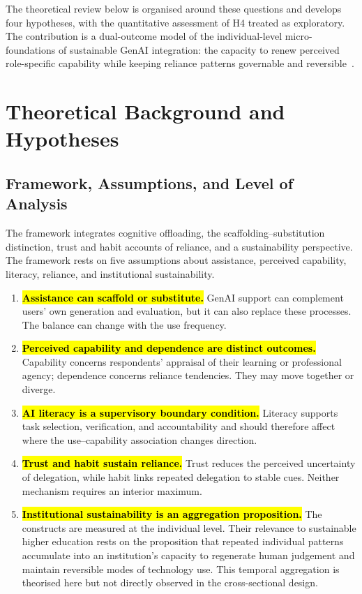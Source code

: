 \documentclass[sustainability,article,accept,moreauthors]{Definitions/mdpi}
\begin{document}
The theoretical review below is organised around these questions and develops four hypotheses, with the quantitative assessment of H4 treated as exploratory. The contribution is a dual-outcome model of the individual-level micro-foundations of sustainable GenAI integration: the capacity to renew perceived role-specific capability while keeping reliance patterns governable and reversible~\cite{chen2026}.

\section{Theoretical Background and Hypotheses}\label{sec:theory}

\subsection{Framework, Assumptions, and Level of Analysis}\label{sec:framework}

The framework integrates cognitive offloading, the
scaffolding--substitution distinction, trust and habit accounts of reliance, and a sustainability perspective. The framework rests on five assumptions about assistance, perceived capability, literacy, reliance, and institutional sustainability.
\begin{enumerate}
\item \textbf{\hl{Assistance can scaffold or substitute.}} GenAI support can complement users' own generation and evaluation, but it can also replace these processes. The balance can change with the use frequency.
\item \textbf{\hl{Perceived capability and dependence are distinct outcomes.}} Capability concerns respondents' appraisal of their learning or professional agency; dependence concerns reliance tendencies. They may move together or diverge.
\item \textbf{\hl{AI literacy is a supervisory boundary condition.}} Literacy supports task selection, verification, and accountability and should therefore affect where the use--capability association changes direction.
\item \textbf{\hl{Trust and habit sustain reliance.}} Trust reduces the perceived uncertainty of delegation, while habit links repeated delegation to stable cues. Neither mechanism requires an interior maximum.
\item \textbf{\hl{Institutional sustainability is an aggregation proposition.}} The constructs are measured at the individual level. Their relevance to sustainable higher education rests on the proposition that repeated individual patterns accumulate into an institution's capacity to regenerate human judgement and maintain reversible modes of technology use. This temporal aggregation is theorised here but not directly observed in the cross-sectional design.
\end{enumerate}
\end{document}
